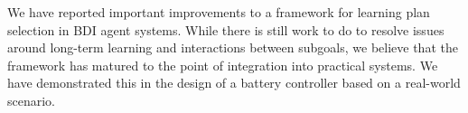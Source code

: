 % 
% 
% 


We have reported important improvements to a framework for learning plan selection in BDI agent systems. While there is still work to do to resolve issues around long-term learning and interactions between subgoals, we believe that the framework has matured to the point of integration into practical systems. We have demonstrated this in the design of a battery controller based on a real-world scenario.




